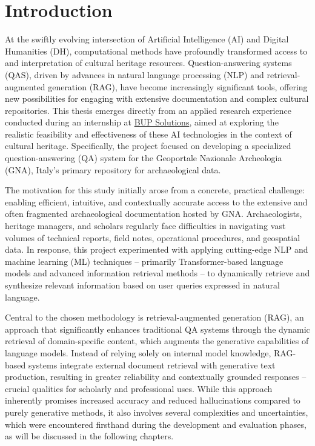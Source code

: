\chapter{Introduction}
\label{chap:introduction}
\begin{spacing}{1.5}  %
At the swiftly evolving intersection of Artificial Intelligence (AI) and Digital Humanities (DH), computational methods have profoundly transformed access to and interpretation of cultural heritage resources. Question-answering systems (QAS), driven by advances in natural language processing (NLP) and retrieval-augmented generation (RAG), have become increasingly significant tools, offering new possibilities for engaging with extensive documentation and complex cultural repositories. This thesis emerges directly from an applied research experience conducted during an internship at \href{https://www.bupsolutions.com/en/home_en/}{BUP Solutions}\nocite{bup_solutions_bup_nodate}, aimed at exploring the realistic feasibility and effectiveness of these AI technologies in the context of cultural heritage. Specifically, the project focused on developing a specialized question-answering (QA) system for the Geoportale Nazionale Archeologia (GNA), Italy’s primary repository for archaeological data.

The motivation for this study initially arose from a concrete, practical challenge: enabling efficient, intuitive, and contextually accurate access to the extensive and often fragmented archaeological documentation hosted by GNA. Archaeologists, heritage managers, and scholars regularly face difficulties in navigating vast volumes of technical reports, field notes, operational procedures, and geospatial data. In response, this project experimented with applying cutting-edge NLP and machine learning (ML) techniques -- primarily Transformer-based language models and advanced information retrieval methods -- to dynamically retrieve and synthesize relevant information based on user queries expressed in natural language.

Central to the chosen methodology is retrieval-augmented generation (RAG), an approach that significantly enhances traditional QA systems through the dynamic retrieval of domain-specific content, which augments the generative capabilities of language models. Instead of relying solely on internal model knowledge, RAG-based systems integrate external document retrieval with generative text production, resulting in greater reliability and contextually grounded responses -- crucial qualities for scholarly and professional uses. While this approach inherently promises increased accuracy and reduced hallucinations compared to purely generative methods, it also involves several complexities and uncertainties, which were encountered firsthand during the development and evaluation phases, as will be discussed in the following chapters.


\end{spacing}
